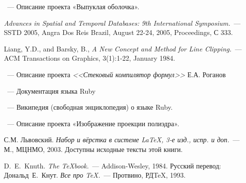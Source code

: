 \begin{thebibliography}{}

~---
Описание проекта «Выпуклая оболочка».

{\em Advances in Spatial and Temporal Databases: 9th International Symposium.}~---
SSTD 2005, Angra Dos Reis Brazil, August 22-24, 2005, Proceedings, С 333.

Liang, Y.D., and Barsky, B., {\em A New Concept and Method for Line Clipping.}~---
ACM Transactions on Graphics, 3(1):1-22, January 1984.

~---
Описание проекта \emph{<<Стековый компилятор формул>>}
Е.А. Роганов

~---
Документация языка Ruby

~---
Википедия (свободная энциклопедия) о языке Ruby.

~---
Описание проекта «Изображение проекции полиэдра».

С.М. Львовский.
{\em Набор и вёрстка в системе \LaTeX, 3-е изд., испр. и доп.}~---
М., МЦНМО, 2003. Доступны исходные тексты этой книги.

D.~E.~Knuth. {\em The \TeX{}book.}~---
Addison-Wesley, 1984. Русский перевод:
Дональд~Е.~Кнут.
{\em Все про \TeX.}~--- Протвино, РД\TeX, 1993.

\end{thebibliography}
